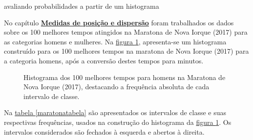 \begin{task}{avaliando probabilidades a partir de um histograma}


No capítulo \hyperref[est2-chap]{\textbf{Medidas de posição e dispersão}} foram trabalhados os dados sobre os 100 melhores tempos atingidos na Maratona de Nova Iorque (2017) para as categorias homens e mulheres. Na \hyperref[maratona-homens-prob]{figura \ref{maratona-homens-prob}}, apresenta-se um histograma construído para os 100 melhores tempos na maratona de Nova Iorque (2017) para a categoria homens, após a conversão destes tempos para minutos.

\begin{figure}[H]
\centering

\caption{Histograma dos 100 melhores tempos para homens na Maratona de Nova Iorque (2017), destacando a frequência absoluta de cada intervalo de classe.}
\label{maratona-homens-prob}
\end{figure}


Na \hyperref[maratonatabela]{
tabela \ref{maratonatabela}} são apresentados os intervalos de classe e suas respectivas frequências, usados na construção do histograma da \hyperref[maratona-homens-prob]{figura \ref{maratona-homens-prob}}. Os intervalos considerados são fechados à esquerda e abertos à direita.


\end{task}
